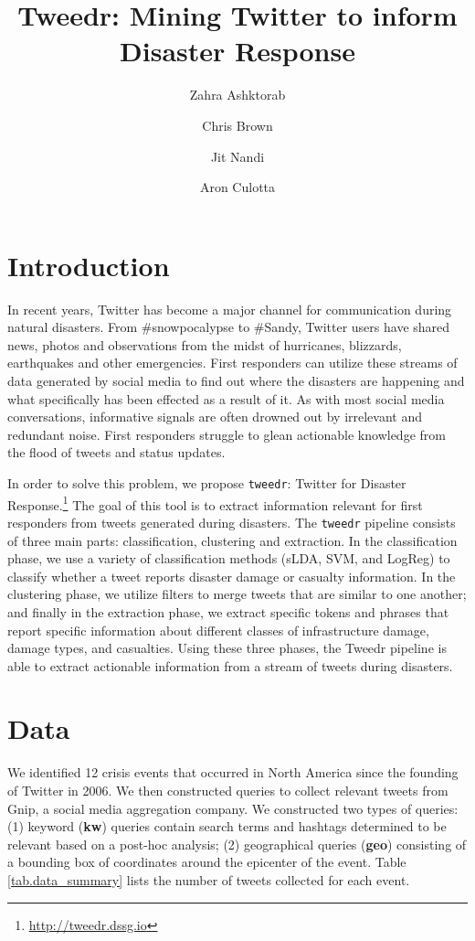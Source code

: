 \documentclass{article}
\title{Tweedr: Mining Twitter to inform Disaster Response}
\author{Zahra Ashktorab \and Chris Brown \and Jit Nandi \and Aron Culotta}
\begin{document}
\maketitle

\section{Introduction}

In recent years, Twitter has become a major channel for communication during
natural disasters. From \#snowpocalypse to \#Sandy, Twitter users have shared
news, photos and observations from the midst of hurricanes, blizzards,
earthquakes and other emergencies. First responders can utilize these streams
of data generated by social media to find out where the disasters are
happening and what specifically has been effected as a result of it.  As with
most social media conversations, informative signals are often drowned out by
irrelevant and redundant noise. First responders struggle to glean actionable
knowledge from the flood of tweets and status updates.

In order to solve this problem, we propose {\tt tweedr}: Twitter for Disaster
Response.\footnote{\url{http://tweedr.dssg.io}} The goal of this tool is to
extract information relevant for first responders from tweets generated during
disasters. The {\tt tweedr} pipeline consists of three main parts:
classification, clustering and extraction. In the classification phase, we use
a variety of classification methods (sLDA, SVM, and LogReg) to classify
whether a tweet reports disaster damage or casualty information. In the
clustering phase, we utilize filters to merge tweets that are similar to one
another; and finally in the extraction phase, we extract specific tokens and
phrases that report specific information about different classes of
infrastructure damage, damage types, and casualties. Using these three phases,
the Tweedr pipeline is able to extract actionable information from a stream of
tweets during disasters.

\section{Data}

We identified 12 crisis events that occurred in North America since the
founding of Twitter in 2006. We then constructed queries to collect relevant
tweets from Gnip, a social media aggregation company. We constructed two types
of queries: (1) keyword ({\bf kw}) queries contain search terms and hashtags
determined to be relevant based on a post-hoc analysis; (2) geographical
queries ({\bf geo}) consisting of a bounding box of coordinates around the
epicenter of the event. Table \ref{tab.data_summary} lists the number of
tweets collected for each event.
\end{document}
